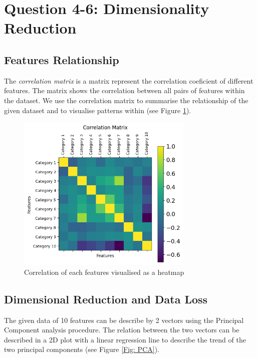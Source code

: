 \section{Question 4-6: Dimensionality Reduction}

\subsection{Features Relationship}

The \emph{correlation matrix} is a matrix represent the correlation coeficient of different features.
The matrix shows the correlation between all pairs of features within the dataset.
We use the correlation matrix to summarise the relationship of the given dataset and to visualise patterns within (see Figure \ref{Fig: Correlation Heatmap}).


\begin{figure}
    \centering
    \includegraphics[width=0.75\textwidth]{Appendices/corr.png}
    \caption{Correlation of each features visualised as a heatmap}
    \label{Fig: Correlation Heatmap}
\end{figure}

\subsection{Dimensional Reduction and Data Loss}

The given data of 10 features can be describe by 2 vectors using the Principal Component analysis procedure.
The relation between the two vectors can be described in a 2D plot with a linear regression line to describe the trend of the two principal components (see Figure \ref{Fig: PCA}).

